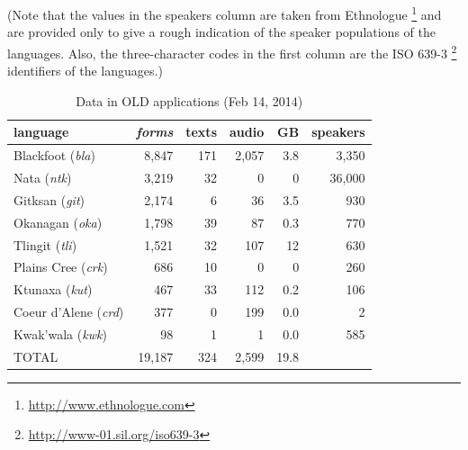 \documentclass[11pt]{article}
\begin{document}
(Note that the values in the speakers column are taken from Ethnologue%
\footnote{\url{http://www.ethnologue.com}} %
and are provided only to give a rough indication of the speaker populations of
the languages. Also, the three-character codes in the first column are the ISO
639-3%
\footnote{\url{http://www-01.sil.org/iso639-3}} %
identifiers of the languages.)


\begin{table}[h]
 \begin{center}
     \scriptsize
\begin{tabular}{lrrrrr}

      \toprule
      language &                     \emph{forms}  & texts & audio & GB   & speakers \\
      \midrule
      Blackfoot (\textit{bla}) &     8,847  & 171   & 2,057 & 3.8  & 3,350    \\ %
      Nata (\textit{ntk}) &          3,219  & 32    & 0     & 0    & 36,000   \\ %
      Gitksan (\textit{git}) &       2,174  & 6     & 36    & 3.5  & 930      \\ %
      Okanagan (\textit{oka}) &      1,798  & 39    & 87    & 0.3  & 770      \\ %
      Tlingit (\textit{tli}) &       1,521  & 32    & 107   & 12   & 630      \\ %
      Plains Cree (\textit{crk}) &   686    & 10    & 0     & 0    & 260      \\ %
      Ktunaxa (\textit{kut}) &       467    & 33    & 112   & 0.2  & 106      \\ %
      Coeur d'Alene (\textit{crd}) & 377    & 0     & 199   & 0.0  & 2        \\ %
      Kwak'wala (\textit{kwk}) &     98     & 1     & 1     & 0.0  & 585      \\ %
      TOTAL &                        19,187 & 324   & 2,599 & 19.8 &         \\ %
      \bottomrule

\end{tabular}
\caption{Data in OLD applications (Feb 14, 2014)}
\label{old-data}
 \end{center}
 \normalsize
\end{table}
\end{document}
